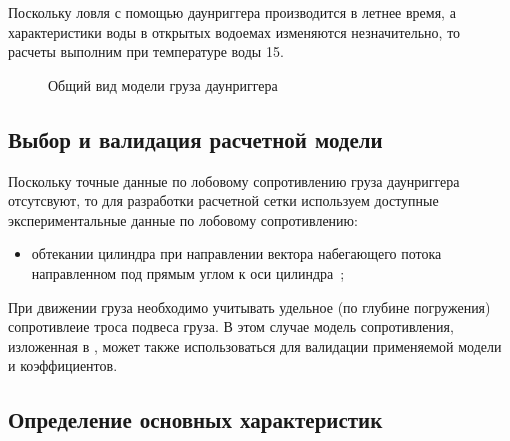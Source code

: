 \documentclass[russian,utf8, pointsubsection]{eskdtext}
\begin{document}
Поскольку ловля с помощью даунриггера производится в летнее время, а характеристики воды в открытых водоемах изменяются незначительно, то расчеты выполним при температуре воды 15\cels. 

\begin{figure}[h]
\caption{Общий вид модели груза даунриггера}
\label{ris:allView}
\end{figure}



\subsection{Выбор и валидация расчетной модели}

Поскольку точные данные по лобовому сопротивлению груза даунриггера отсутсвуют, то для разработки расчетной сетки используем доступные экспериментальные данные по лобовому сопротивлению:
\begin{itemize}
\item обтекании цилиндра при направлении вектора набегающего потока направленном под прямым углом к оси цилиндра~\cite{cylInFlow};
\end{itemize}

При движении груза необходимо учитывать удельное (по глубине погружения) сопротивлеие троса подвеса груза. В этом случае модель сопротивления, изложенная в \cite{cylInFlow}, может также использоваться для валидации применяемой модели и коэффициентов. 


\subsection{Определение основных характеристик}
\end{document}
